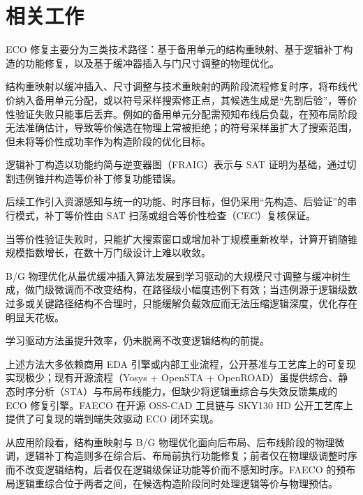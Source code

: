 \documentclass[twocolumn,10pt]{ctexart}
\begin{document}
\section{相关工作}

ECO 修复主要分为三类技术路径：基于备用单元的结构重映射、基于逻辑补丁构造的功能修复，以及基于缓冲器插入与门尺寸调整的物理优化。

结构重映射以缓冲插入、尺寸调整与技术重映射的两阶段流程修复时序，将布线代价纳入备用单元分配\cite{ho2010eco,ho2012treco}，或以符号采样搜索修正点\cite{kravets2019symbolic}，其候选生成是“先割后验”，等价性验证失败只能事后丢弃。例如\cite{ho2010eco}的备用单元分配需预知布线后负载，在预布局阶段无法准确估计，导致等价候选在物理上常被拒绝；\cite{kravets2019symbolic}的符号采样虽扩大了搜索范围，但未将等价性成功率作为构造阶段的优化目标。

逻辑补丁构造以功能约简与逆变器图（FRAIG）表示与 SAT 证明为基础，通过切割违例锥并构造等价补丁修复功能错误\cite{jiang2010fraig,jiang2016resource}。

后续工作引入资源感知\cite{jiang2016resource}与统一的功能、时序目标\cite{lin2011simult,luo2016unified}，但仍采用“先构造、后验证”的串行模式，补丁等价性由 SAT 扫荡或组合等价性检查（CEC）复核保证\cite{mishchenko2006sat,zhong2024stp}。

当等价性验证失败时，只能扩大搜索窗口或增加补丁规模重新枚举\cite{zhuo2018patch}，计算开销随锥规模指数增长，在数十万门级设计上难以收敛。

B/G 物理优化从最优缓冲插入算法\cite{liang2012buffer}发展到学习驱动的大规模尺寸调整与缓冲树生成\cite{liu2021rlsizer,huang2025phys,chen2024aito,zhang2025buffalo}，做门级微调而不改变结构，在路径级小幅度违例下有效；当违例源于逻辑级数过多或关键路径结构不合理时，只能缓解负载效应而无法压缩逻辑深度，优化存在明显天花板\cite{liu2021rlsizer,huang2025phys}。

学习驱动方法\cite{chen2024aito,zhang2025buffalo}虽提升效率，仍未脱离不改变逻辑结构的前提。

上述方法大多依赖商用 EDA 引擎或内部工业流程，公开基准与工艺库上的可复现实现极少；现有开源流程（Yosys\cite{yosys} + OpenSTA\cite{opensta} + OpenROAD\cite{openroad}）虽提供综合、静态时序分析（STA）与布局布线能力，但缺少将逻辑重综合与失效反馈集成的 ECO 修复引擎。FAECO 在开源 OSS-CAD 工具链与 SKY130 HD\cite{sky130} 公开工艺库上提供了可复现的端到端失效驱动 ECO 闭环实现。

从应用阶段看，结构重映射与 B/G 物理优化面向后布局、后布线阶段的物理微调，逻辑补丁构造则多在综合后、布局前执行功能修复；前者仅在物理级调整时序而不改变逻辑结构，后者仅在逻辑级保证功能等价而不感知时序。FAECO 的预布局逻辑重综合位于两者之间，在候选构造阶段同时处理逻辑等价与物理预估。
\end{document}
